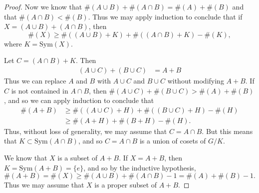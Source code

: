 \begin{proof}
    Now we know that $\#(A \cup B) + \#(A \cap B) = \#(A) + \#(B)$ and that $\#(A \cap B) < \#(B)$. Thus we may apply induction to conclude that if $X = (A \cup B) + (A \cap B)$, then
    \[ \#(X) \geq \#((A \cup B) + K) + \#((A \cap B) + K) - \#(K), \]
    where $K = \text{Sym}(X)$.

    Let $C = (A \cap B) + K$. Then
    \begin{align*}
        (A \cup C) + (B \cup C) &= A + B
    \end{align*}
    Thus we can replace $A$ and $B$ with $A \cup C$ and $B \cup C$ without modifying $A + B$. If $C$ is not contained in $A \cap B$, then $\#(A \cup C) + \#(B \cup C) > \#(A) + \#(B)$, and so we can apply induction to conclude that
    \begin{align*}
        \#(A + B) &\geq \#((A \cup C) + H) + \#((B \cup C) + H) - \#(H)\\
        &\geq \#(A + H) + \#(B + H) - \#(H).
    \end{align*}
    Thus, without loss of generality, we may assume that $C = A \cap B$. But this means that $K \subset \text{Sym}(A \cap B)$, and so $C = A \cap B$ is a union of cosets of $G/K$.

    We know that $X$ is a subset of $A + B$. If $X = A + B$, then $K = \text{Sym}(A + B) = \{ e \}$, and so by the inductive hypothesis,
    \[ \#(A + B) = \#(X) \geq \#(A \cup B) + \#(A \cap B) - 1 = \#(A) + \#(B) - 1. \]
    Thus we may assume that $X$ is a proper subset of $A + B$.


\end{proof}
